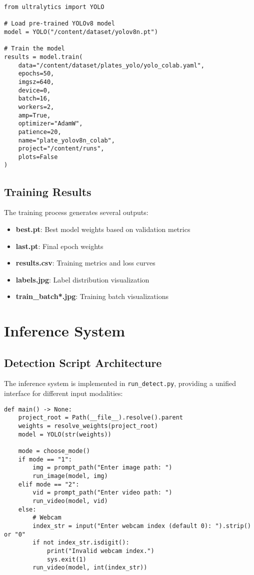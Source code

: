 \documentclass[12pt,a4paper]{article}
\begin{document}
\begin{lstlisting}[caption=Training Implementation]
from ultralytics import YOLO

# Load pre-trained YOLOv8 model
model = YOLO("/content/dataset/yolov8n.pt")

# Train the model
results = model.train(
    data="/content/dataset/plates_yolo/yolo_colab.yaml",
    epochs=50,
    imgsz=640,
    device=0,
    batch=16,
    workers=2,
    amp=True,
    optimizer="AdamW",
    patience=20,
    name="plate_yolov8n_colab",
    project="/content/runs",
    plots=False
)
\end{lstlisting}

\subsection{Training Results}
The training process generates several outputs:

\begin{itemize}
    \item \textbf{best.pt}: Best model weights based on validation metrics
    \item \textbf{last.pt}: Final epoch weights
    \item \textbf{results.csv}: Training metrics and loss curves
    \item \textbf{labels.jpg}: Label distribution visualization
    \item \textbf{train\_batch*.jpg}: Training batch visualizations
\end{itemize}

\section{Inference System}

\subsection{Detection Script Architecture}
The inference system is implemented in \texttt{run\_detect.py}, providing a unified interface for different input modalities:

\begin{lstlisting}[caption=Main Detection Function]
def main() -> None:
    project_root = Path(__file__).resolve().parent
    weights = resolve_weights(project_root)
    model = YOLO(str(weights))

    mode = choose_mode()
    if mode == "1":
        img = prompt_path("Enter image path: ")
        run_image(model, img)
    elif mode == "2":
        vid = prompt_path("Enter video path: ")
        run_video(model, vid)
    else:
        # Webcam
        index_str = input("Enter webcam index (default 0): ").strip() or "0"
        if not index_str.isdigit():
            print("Invalid webcam index.")
            sys.exit(1)
        run_video(model, int(index_str))
\end{lstlisting}
\end{document}
